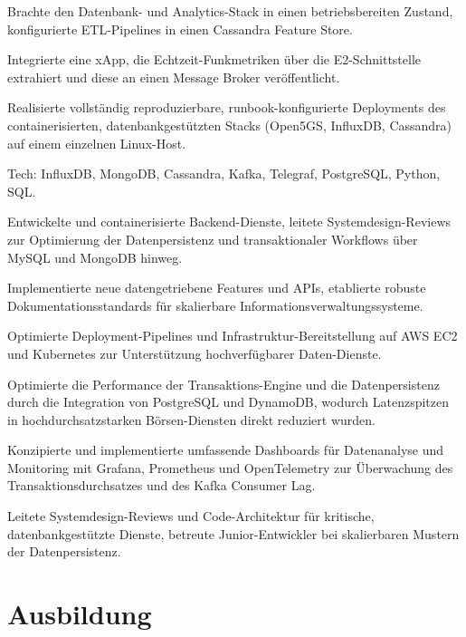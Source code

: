 \documentclass[10pt,a4paper]{resume}
\begin{document}
\bullets
  \item Brachte den Datenbank- und Analytics-Stack in einen betriebsbereiten Zustand, konfigurierte ETL-Pipelines in einen Cassandra Feature Store.
  \item Integrierte eine xApp, die Echtzeit-Funkmetriken über die E2-Schnittstelle extrahiert und diese an einen Message Broker veröffentlicht.
  \item Realisierte vollständig reproduzierbare, runbook-konfigurierte Deployments des containerisierten, datenbankgestützten Stacks (Open5GS, InfluxDB, Cassandra) auf einem einzelnen Linux-Host.
  \item Tech: InfluxDB, MongoDB, Cassandra, Kafka, Telegraf, PostgreSQL, Python, SQL.
\bulletsend
\vspace{1.5pt}
\bullets
  \item Entwickelte und containerisierte Backend-Dienste, leitete Systemdesign-Reviews zur Optimierung der Datenpersistenz und transaktionaler Workflows über MySQL und MongoDB hinweg.
  \item Implementierte neue datengetriebene Features und APIs, etablierte robuste Dokumentationsstandards für skalierbare Informationsverwaltungssysteme.
  \item Optimierte Deployment-Pipelines und Infrastruktur-Bereitstellung auf AWS EC2 und Kubernetes zur Unterstützung hochverfügbarer Daten-Dienste.
\bulletsend
\vspace{1.5pt}
\bullets
  \item Optimierte die Performance der Transaktions-Engine und die Datenpersistenz durch die Integration von PostgreSQL und DynamoDB, wodurch Latenzspitzen in hochdurchsatzstarken Börsen-Diensten direkt reduziert wurden.
  \item Konzipierte und implementierte umfassende Dashboards für Datenanalyse und Monitoring mit Grafana, Prometheus und OpenTelemetry zur Überwachung des Transaktionsdurchsatzes und des Kafka Consumer Lag.
  \item Leitete Systemdesign-Reviews und Code-Architektur für kritische, datenbankgestützte Dienste, betreute Junior-Entwickler bei skalierbaren Mustern der Datenpersistenz.
\bulletsend
\vspace{1.5pt}

\section{Ausbildung}
\end{document}
